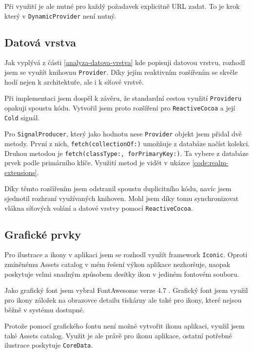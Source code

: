 Při využití je ale nutné pro každý požadavek explicitně URL zadat.
To je krok který v \texttt{DynamicProvider} není nutný.

\subsection{Datová vrstva}

Jak vyplývá z části \ref{analyza-datova-vrstva} kde popisuji datovou vrstvu, rozhodl jsem se využít knihovnu \texttt{Provider}.
Díky jejím reaktivním rozšířením se skvěle hodí nejen k architektuře, ale i k síťové vrstvě.

Při implementaci jsem dospěl k závěru, že standardní cestou využití \texttt{Provideru} opakuji spoustu kódu.
Vytvořil jsem proto rozšíření pro \texttt{ReactiveCocoa} a její \texttt{Cold} signál.

Pro \texttt{SignalProducer}, který jako hodnotu nese \texttt{Provider} objekt jsem přidal dvě metody.
První z nich, \texttt{fetch(collectionOf:)} umožňuje z databáze načíst kolekci.
Druhou metodou je \texttt{fetch(classType:, forPrimaryKey:)}.
Ta vybere z databáze prvek podle primárního klíče.
Využití metod je vidět v ukázce \ref{code:realm-extensions}.


Díky těmto rozšířením jsem odstranil spoustu duplicitního kódu, navíc jsem sjednotil rozhraní využívaných knihoven.
Mohl jsem díky tomu synchronizovat vlákna síťových volání a datové vrstvy pomocí \texttt{ReactiveCocoa}.

\subsection{Grafické prvky}

Pro ilustrace a ikony v aplikaci jsem se rozhodl využít framework \texttt{Iconic}.
Oproti zmíněnému Assets catalog v mém řešení výkon aplikace nezhoršuje, naopak poskytuje velmi snadným způsobem desítky ikon v jediném fontovém souboru.

Jako grafický font jsem vybral FontAwesome verze 4.7 \cite{fontawesome-web}.
Grafický font jsem využil pro ikony záložek na obrazovce detailu tiskárny ale také pro ikony, které nejsou běžně v systému dostupné.

Protože pomocí grafického fontu není možné vytvořit ikonu aplikaci, využil jsem také Assets catalog.
Využit je ale právě pro ikonu aplikace, ostatní potřebné ilustrace poskytuje \texttt{CoreData}.

